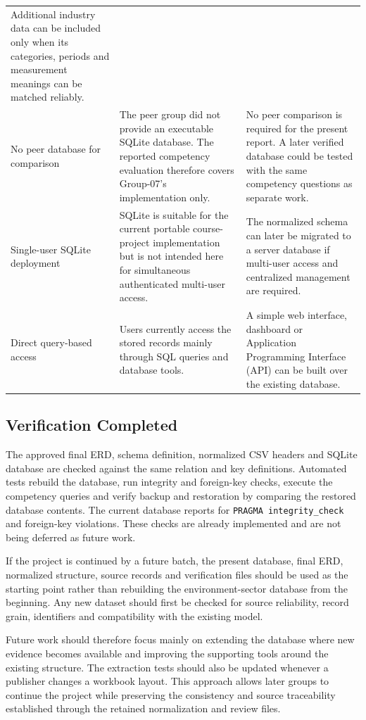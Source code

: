 \begin{longtable}{L{0.20\textwidth}L{0.32\textwidth}L{0.32\textwidth}}
Additional industry data can be included only when its categories, periods and
measurement meanings can be matched reliably. \\
No peer database for comparison &
The peer group did not provide an executable SQLite database. The reported
competency evaluation therefore covers Group-07's implementation only. &
No peer comparison is required for the present report. A later verified
database could be tested with the same competency questions as separate work. \\
Single-user SQLite deployment &
SQLite is suitable for the current portable course-project implementation but
is not intended here for simultaneous authenticated multi-user access. &
The normalized schema can later be migrated to a server database if multi-user
access and centralized management are required. \\
Direct query-based access &
Users currently access the stored records mainly through SQL queries and
database tools. &
A simple web interface, dashboard or Application Programming Interface (API)
can be built over the existing database. \\
\end{longtable}

\subsection{Verification Completed}
\label{subsec:verification-completed}

The approved final ERD, schema definition, normalized CSV headers and SQLite
database are checked against the same relation and key definitions. Automated
tests rebuild the database, run integrity and foreign-key checks, execute the
competency queries and verify backup and restoration by comparing the restored
database contents. The current database reports \mDbIntegrity{} for
\texttt{PRAGMA integrity\_check} and \mDbFkViolations{} foreign-key violations.
These checks are already implemented and are not being deferred as future work.

If the project is continued by a future batch, the present database, final ERD,
normalized structure, source records and verification files should be used as
the starting point rather than rebuilding the environment-sector database from
the beginning. Any new dataset should first be checked for source reliability,
record grain, identifiers and compatibility with the existing model.

Future work should therefore focus mainly on extending the database where new
evidence becomes available and improving the supporting tools around the
existing structure. The extraction tests should also be updated whenever a
publisher changes a workbook layout. This approach allows later groups to
continue the project while preserving the consistency and source traceability
established through the retained normalization and review files.

